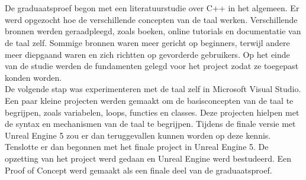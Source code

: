 
\chapter{}%
\label{ch:methodologie}


De graduaatsproef begon met een literatuurstudie over C++ in het algemeen. Er werd opgezocht hoe de verschillende concepten van de taal werken.
Verschillende bronnen werden geraadpleegd, zoals boeken, online tutorials en documentatie van de taal zelf. 
Sommige bronnen waren meer gericht op beginners, terwijl andere meer diepgaand waren en zich richtten op gevorderde gebruikers.
Op het einde van de studie werden de fundamenten gelegd voor het project zodat ze toegepast konden worden.
\\

De volgende stap was experimenteren met de taal zelf in Microsoft Visual Studio.
Een paar kleine projecten werden gemaakt om de basisconcepten van de taal te begrijpen, zoals variabelen, loops, functies en classes.
Deze projecten hielpen met de syntax en mechanismen van de taal te begrijpen. 
Tijdens de finale versie met Unreal Engine 5 zou er dan teruggevallen kunnen worden op deze kennis.
\\

Tenslotte er dan begonnen met het finale project in Unreal Engine 5.
De opzetting van het project werd gedaan en Unreal Engine werd bestudeerd.
Een Proof of Concept werd gemaakt als een finale deel van de graduaatsproef.

